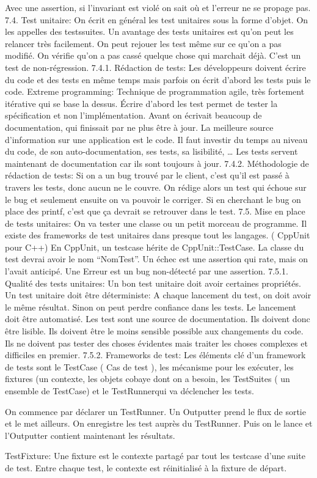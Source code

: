 Avec une assertion, si l’invariant est violé on sait où et l’erreur ne se propage pas.
7.4. Test unitaire:
On écrit en général les test unitaires sous la forme d’objet. On les appelles des testssuites.
Un avantage des tests unitaires est qu’on peut les relancer très facilement. On peut rejouer les test même sur ce qu’on a pas modifié. On vérifie qu’on a pas cassé quelque chose qui marchait déjà. C’est un test de non-régression.
7.4.1. Rédaction de tests:
Les développeurs doivent écrire du code et des tests en même temps mais parfois on écrit d’abord les tests puis le code.
Extreme programming: Technique de programmation agile, très fortement itérative qui se base la dessus.
Écrire d’abord les test permet de tester la spécification et non l’implémentation.
Avant on écrivait beaucoup de documentation, qui finissait par ne plus être à jour. La meilleure source d’information sur une application est le code. Il faut investir du temps au niveau du code, de son auto-documentation, ses tests, sa lisibilité, …
Les tests servent maintenant de documentation car ils sont toujours à jour.
7.4.2. Méthodologie de rédaction de tests:
Si on a un bug trouvé par le client, c’est qu’il est passé à travers les tests, donc aucun ne le couvre.
On rédige alors un test qui échoue sur le bug et seulement ensuite on va pouvoir le corriger.
Si en cherchant le bug on place des printf, c’est que ça devrait se retrouver dans le test.
7.5. Mise en place de tests unitaires:
On va tester une classe ou un petit morceau de programme.
Il existe des frameworks de test unitaires dans presque tout les langages. ( CppUnit pour C++)
En CppUnit, un testcase hérite de CppUnit::TestCase. La classe du test devrai avoir le nom “NomTest”.
Un échec est une assertion qui rate, mais on l’avait anticipé. Une Erreur est un bug non-détecté par une assertion.
7.5.1. Qualité des tests unitaires:
Un bon test unitaire doit avoir certaines propriétés.
Un test unitaire doit être déterministe: A chaque lancement du test, on doit avoir le même résultat. Sinon on peut perdre confiance dans les tests.
Le lancement doit être automatisé.
Les test sont une source de documentation. Ils doivent donc être lisible.
Ils doivent être le moins sensible possible aux changements du code.
Ils ne doivent pas tester des choses évidentes mais traiter les choses complexes et difficiles en premier.
7.5.2. Frameworks de test:
Les éléments clé d’un framework de tests sont le TestCase ( Cas de test ), les mécanisme pour les exécuter, les fixtures (un contexte, les objets cobaye dont on a besoin, les TestSuites ( un ensemble de TestCase) et le TestRunnerqui va déclencher les tests.

On commence par déclarer un TestRunner. Un Outputter prend le flux de sortie et le met ailleurs.
On enregistre les test auprès du TestRunner. Puis on le lance et l’Outputter contient maintenant les résultats.

TestFixture: Une fixture est le contexte partagé par tout les testcase d’une suite de test.
Entre chaque test, le contexte est réinitialisé à la fixture de départ.